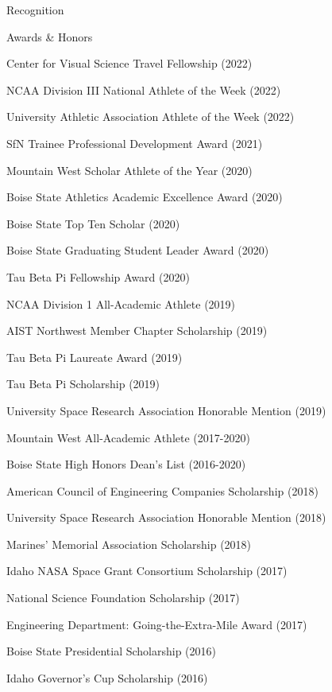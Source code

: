\documentclass{resume} %
\begin{document}
\newpage
\begin{rSection}{Recognition}
\begin{rSubsection2}{Awards \& Honors}{}{}{}
\item Center for Visual Science Travel Fellowship (2022)
\item NCAA Division III National Athlete of the Week (2022)
\item University Athletic Association Athlete of the Week (2022)
\item SfN Trainee Professional Development Award (2021)
\item Mountain West Scholar Athlete of the Year (2020)
\item Boise State Athletics Academic Excellence Award (2020) 
\item Boise State Top Ten Scholar (2020)
\item Boise State Graduating Student Leader Award (2020)
\item Tau Beta Pi Fellowship Award (2020)
\item NCAA Division 1 All-Academic Athlete (2019) 
\item AIST Northwest Member Chapter Scholarship (2019)
\item Tau Beta Pi Laureate Award (2019)
\item Tau Beta Pi Scholarship (2019)
\item University Space Research Association Honorable Mention (2019)
\item Mountain West All-Academic Athlete (2017-2020)
\item Boise State High Honors Dean’s List (2016-2020)
\item American Council of Engineering Companies Scholarship (2018)
\item University Space Research Association Honorable Mention (2018)
\item Marines’ Memorial Association Scholarship (2018)
\item Idaho NASA Space Grant Consortium Scholarship (2017)
\item National Science Foundation Scholarship (2017)
\item Engineering Department: Going-the-Extra-Mile Award (2017)
\item Boise State Presidential Scholarship (2016)
\item Idaho Governor’s Cup Scholarship (2016)

\end{rSubsection2}
\end{rSection}
\end{document}
